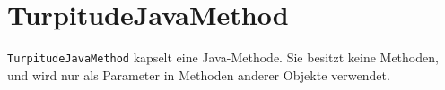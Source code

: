
\section{TurpitudeJavaMethod}

\texttt{TurpitudeJavaMethod} kapselt eine Java-Methode. 
Sie besitzt keine Methoden, und wird nur als Parameter in Methoden
anderer Objekte verwendet.


